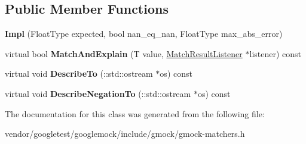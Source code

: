 \subsection*{Public Member Functions}
\begin{DoxyCompactItemize}
\item 
\mbox{\label{classtesting_1_1internal_1_1_floating_eq_matcher_1_1_impl_a314057e171f872ad478b3e143121aecd}} 
{\bfseries Impl} (Float\+Type expected, bool nan\+\_\+eq\+\_\+nan, Float\+Type max\+\_\+abs\+\_\+error)
\item 
\mbox{\label{classtesting_1_1internal_1_1_floating_eq_matcher_1_1_impl_a4ce47c481fdc4973ed671a492f455f99}} 
virtual bool {\bfseries Match\+And\+Explain} (T value, \hyperlink{classtesting_1_1_match_result_listener}{Match\+Result\+Listener} $\ast$listener) const
\item 
\mbox{\label{classtesting_1_1internal_1_1_floating_eq_matcher_1_1_impl_aab6dbbe39ef8337e4686ae0f8c81a2c3}} 
virtual void {\bfseries Describe\+To} (\+::std\+::ostream $\ast$os) const
\item 
\mbox{\label{classtesting_1_1internal_1_1_floating_eq_matcher_1_1_impl_a3eff238a812f4a105df1222a28f6cdbf}} 
virtual void {\bfseries Describe\+Negation\+To} (\+::std\+::ostream $\ast$os) const
\end{DoxyCompactItemize}


The documentation for this class was generated from the following file\+:\begin{DoxyCompactItemize}
\item 
vendor/googletest/googlemock/include/gmock/gmock-\/matchers.\+h\end{DoxyCompactItemize}
